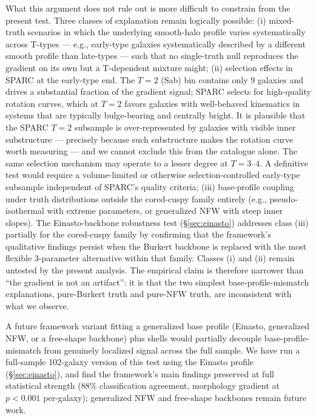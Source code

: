 \documentclass[linenumbers]{aastex701}
\begin{document}
What this argument does not rule out is more difficult to constrain from the present test. Three classes of explanation remain logically possible: (i) mixed-truth scenarios in which the underlying smooth-halo profile varies systematically across T-types --- e.g., early-type galaxies systematically described by a different smooth profile than late-types --- such that no single-truth null reproduces the gradient on its own but a T-dependent mixture might; (ii) selection effects in SPARC at the early-type end. The $T=2$ (Sab) bin contains only 9 galaxies and drives a substantial fraction of the gradient signal; SPARC selects for high-quality rotation curves, which at $T=2$ favors galaxies with well-behaved kinematics in systems that are typically bulge-bearing and centrally bright. It is plausible that the SPARC $T=2$ subsample is over-represented by galaxies with visible inner substructure --- precisely because such substructure makes the rotation curve worth measuring --- and we cannot exclude this from the catalogue alone. The same selection mechanism may operate to a lesser degree at $T=3$--$4$. A definitive test would require a volume-limited or otherwise selection-controlled early-type subsample independent of SPARC's quality criteria; (iii) base-profile coupling under truth distributions outside the cored-cuspy family entirely (e.g., pseudo-isothermal with extreme parameters, or generalized NFW with steep inner slopes). The Einasto-backbone robustness test (\S\ref{sec:einasto}) addresses class (iii) partially for the cored-cuspy family by confirming that the framework's qualitative findings persist when the Burkert backbone is replaced with the most flexible 3-parameter alternative within that family. Classes (i) and (ii) remain untested by the present analysis. The empirical claim is therefore narrower than ``the gradient is not an artifact'': it is that the two simplest base-profile-mismatch explanations, pure-Burkert truth and pure-NFW truth, are inconsistent with what we observe.

A future framework variant fitting a generalized base profile (Einasto, generalized NFW, or a free-shape backbone) plus shells would partially decouple base-profile-mismatch from genuinely localized signal across the full sample. We have run a full-sample 102-galaxy version of this test using the Einasto profile (\S\ref{sec:einasto}), and find the framework's main findings preserved at full statistical strength (88\% classification agreement, morphology gradient at $p < 0.001$ per-galaxy); generalized NFW and free-shape backbones remain future work.
\end{document}
